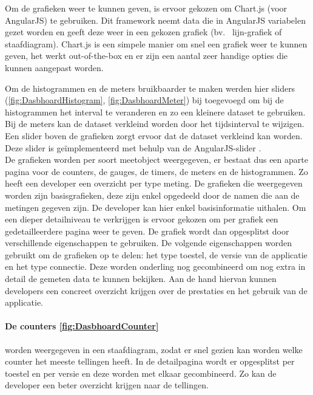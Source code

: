 Om de grafieken weer te kunnen geven, is ervoor gekozen om Chart.js\cite{ChartJS} (voor AngularJS) te gebruiken. Dit framework neemt data die in AngularJS variabelen gezet worden en geeft deze weer in een gekozen grafiek (bv.~ lijn-grafiek of staafdiagram). Chart.js is een simpele manier om snel een grafiek weer te kunnen geven, het werkt out-of-the-box en er zijn een aantal zeer handige opties die kunnen aangepast worden. 

Om de histogrammen en de meters bruikbaarder te maken werden hier sliders (\ref{fig:DasbhoardHistogram}, \ref{fig:DasbhoardMeter}) bij toegevoegd om bij de histogrammen het interval te veranderen en zo een kleinere dataset te gebruiken. Bij de meters kan de dataset verkleind worden door het tijdsinterval te wijzigen. Een slider boven de grafieken zorgt ervoor dat de dataset verkleind kan worden. Deze slider is ge\"implementeerd met behulp van de AngularJS-slider \cite{AngularSlider}.\\


De grafieken worden per soort meetobject weergegeven, er bestaat dus een aparte pagina voor de counters, de gauges, de timers, de meters en de histogrammen. Zo heeft een developer een overzicht per type meting. De grafieken die weergegeven worden zijn basisgrafieken, deze zijn enkel opgedeeld door de namen die aan de metingen gegeven zijn. De developer kan hier enkel basisinformatie uithalen. Om een dieper detailniveau te verkrijgen is ervoor gekozen om per grafiek een gedetailleerdere pagina weer te geven. De grafiek wordt dan opgesplitst door verschillende eigenschappen te gebruiken. De volgende eigenschappen worden gebruikt om de grafieken op te delen: het type toestel, de versie van de applicatie en het type connectie. Deze worden onderling nog gecombineerd om nog extra in detail de gemeten data te kunnen bekijken. Aan de hand hiervan kunnen developers een concreet overzicht krijgen over de prestaties en het gebruik van de applicatie. \\

\paragraph{De counters \ref{fig:DasbhoardCounter}} worden weergegeven in een staafdiagram, zodat er snel gezien kan worden welke counter het meeste tellingen heeft. In de detailpagina wordt er opgesplitst per toestel en per versie en deze worden met elkaar gecombineerd. Zo kan de developer een beter overzicht krijgen naar de tellingen.\\

